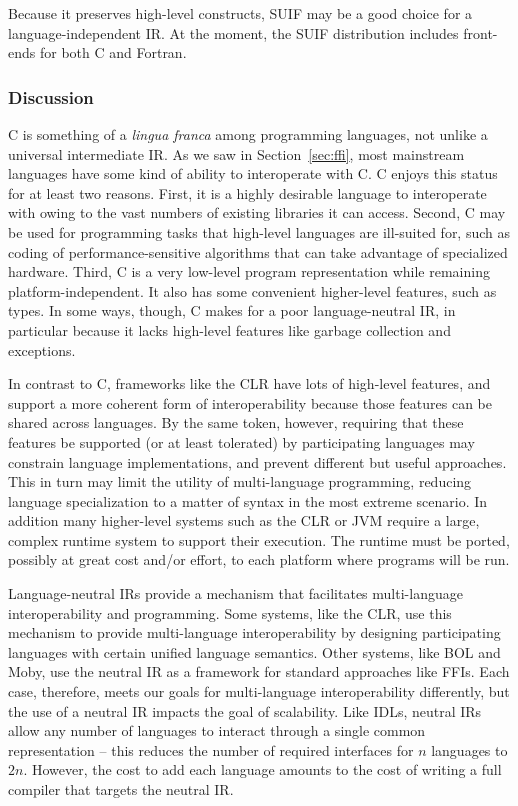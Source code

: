 Because it preserves high-level constructs, SUIF may be a good choice for a language-independent IR. At the moment, the SUIF distribution includes front-ends for both C and Fortran.


\subsubsection{Discussion}

C is something of a \emph{lingua franca} among programming
languages, not unlike a universal intermediate IR. As we saw in
Section~\ref{sec:ffi}, most mainstream languages have some kind of
ability to interoperate with C. C enjoys this status for at least
two reasons. First, it is a highly desirable language to
interoperate with owing to the vast numbers of existing libraries
it can access. Second, C may be used for programming tasks that
high-level languages are ill-suited for, such as coding of
performance-sensitive algorithms that can take advantage of
specialized hardware. Third, C is a very low-level program
representation while remaining platform-independent. It also has
some convenient higher-level features, such as types. In some
ways, though, C makes for a poor language-neutral IR, in
particular because it lacks high-level features like garbage
collection and exceptions.

In contrast to C, frameworks like the CLR have lots of high-level
features, and support a more coherent form of interoperability
because those features can be shared across languages. By the same
token, however, requiring that these features be supported (or at
least tolerated) by participating languages may constrain language
implementations, and prevent different but useful approaches. This
in turn may limit the utility of multi-language programming,
reducing language specialization to a matter of syntax in the most
extreme scenario. In addition many higher-level systems such as
the CLR or JVM require a large, complex runtime system to support
their execution. The runtime must be ported, possibly at great
cost and/or effort, to each platform where programs will be run.

Language-neutral IRs provide a mechanism that facilitates multi-language interoperability and programming. Some systems, like the CLR, use this mechanism to provide multi-language interoperability by designing participating languages with certain unified language semantics. Other systems, like BOL and Moby, use the neutral IR as a framework for standard approaches like FFIs. Each case, therefore, meets our goals for multi-language interoperability differently, but the use of a neutral IR impacts the goal of scalability. Like IDLs, neutral IRs allow any number of languages to interact through a single common representation -- this reduces the number of required interfaces for $n$ languages to $2n$. However, the cost to add each language amounts to the cost of writing a full compiler that targets the neutral IR.

